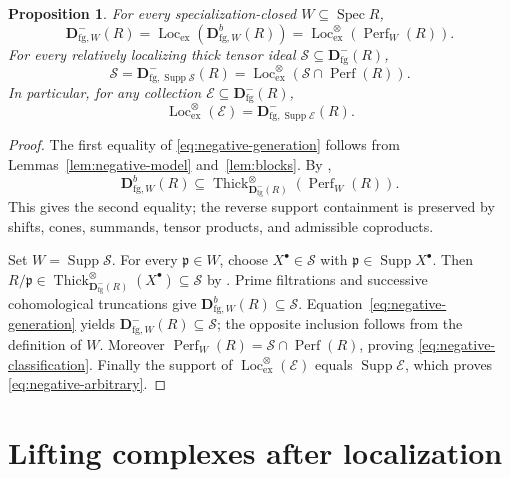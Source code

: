 \documentclass[11pt]{amsart}
\numberwithin{equation}{section}
\newtheorem{proposition}[theorem]{Proposition}
\theoremstyle{definition}
\theoremstyle{remark}
\DeclareMathOperator{\Supp}{Supp}
\DeclareMathOperator{\Spec}{Spec}
\DeclareMathOperator{\Perf}{Perf}
\DeclareMathOperator{\Loc}{Loc}
\DeclareMathOperator{\Thick}{Thick}
\newcommand{\D}{\mathbf D}
\newcommand{\fg}{\mathrm{fg}}
\newcommand{\Lex}{\Loc_{\mathrm{ex}}}
\newcommand{\Lten}{\Loc_{\mathrm{ex}}^{\otimes}}
\newcommand{\p}{\mathfrak p}
\begin{document}
\begin{proposition}\label{thm:negative}
For every specialization-closed $W\subseteq\Spec R$,
\begin{equation}\label{eq:negative-generation}
 \D^-_{\fg,W}(R)=\Lex(\D^b_{\fg,W}(R))=\Lten(\Perf_W(R)).
\end{equation}
For every relatively localizing thick tensor ideal $\mathcal S\subseteq\D^-_{\fg}(R)$,
\begin{equation}\label{eq:negative-classification}
 \mathcal S=\D^-_{\fg,\Supp\mathcal S}(R)
 =\Lten(\mathcal S\cap\Perf(R)).
\end{equation}
In particular, for any collection $\mathcal E\subseteq\D^-_{\fg}(R)$,
\begin{equation}\label{eq:negative-arbitrary}
 \Lten(\mathcal E)=\D^-_{\fg,\Supp\mathcal E}(R).
\end{equation}
\end{proposition}
\begin{proof}
The first equality of \eqref{eq:negative-generation} follows from
Lemmas~\ref{lem:negative-model} and~\ref{lem:blocks}. By
\cite[Corollary~2.14]{MT17},
\[
 \D^b_{\fg,W}(R)\subseteq\Thick^{\otimes}_{\D^-_{\fg}(R)}(\Perf_W(R)).
\]
This gives the second equality; the reverse support containment is preserved
by shifts, cones, summands, tensor products, and admissible coproducts.

Set $W=\Supp\mathcal S$. For every $\p\in W$, choose
$X^{\bullet}\in\mathcal S$ with $\p\in\Supp X^{\bullet}$. Then
$R/\p\in\Thick^\otimes_{\D^-_{\fg}(R)}(X^{\bullet})\subseteq\mathcal S$
by \cite[Corollary~2.11]{MT17}.
Prime filtrations and successive cohomological truncations give
$\D^b_{\fg,W}(R)\subseteq\mathcal S$.
Equation~\eqref{eq:negative-generation} yields
$\D^-_{\fg,W}(R)\subseteq\mathcal S$; the opposite inclusion follows from
the definition of $W$.
Moreover $\Perf_W(R)=\mathcal S\cap\Perf(R)$, proving
\eqref{eq:negative-classification}. Finally the support of
$\Lten(\mathcal E)$ equals $\Supp\mathcal E$, which proves
\eqref{eq:negative-arbitrary}.
\end{proof}

\section{Lifting complexes after localization}
\end{document}
